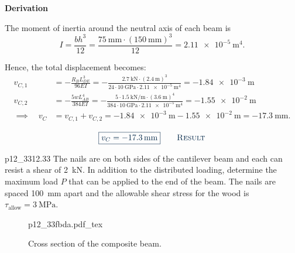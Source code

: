 \documentclass[a4paper]{article}
\newcommand{\incfig}[2][1]{%
  \def\svgwidth{#1\columnwidth}
  {#2.pdf_tex}
}
\newcounter{problem}
\numberwithin{equation}{problem}
\newcommand{\AUheading}[1]{%
  \par\vspace{.4\baselineskip}%
  {\sffamily\bfseries\color{AUblueDark}#1\par}%
  \nobreak%
}
\newenvironment{derivation}[1][Derivation]{%
  \AUheading{#1}
  \begingroup\allowdisplaybreaks
  \setlength{\abovedisplayskip}{6pt}%
  \setlength{\belowdisplayskip}{6pt}%
  \setlength{\abovedisplayshortskip}{4pt}%
  \setlength{\belowdisplayshortskip}{4pt}%
}{\par\endgroup\medskip}
\newcommand{\finalresult}[1]{%
  \vspace{.2\baselineskip}%
  \begin{equation}
    {\color{AUblueDark}\boxed{\displaystyle #1}}
    \tag*{\textsc{\textcolor{AUblueDark}{Result}}}
  \end{equation}
  \newpage
}
\begin{document}
\begin{derivation}
  The moment of inertia around the neutral axis of each beam is
  \begin{equation*}
    I = \frac{b h^3}{12} = \frac{\qty{75}{\mm} \cdot \left( \qty{150}{\mm}  \right)^3}{12} = \qty{2,11e-5}{\m^{4}} 
  .\end{equation*}
  
  Hence, the total displacement becomes:
  \begin{align*}
    v_{C,1} &= - \frac{R_B L_{DE}^3}{96 EI} = - \frac{\qty{2,7}{\kN} \cdot \left( \qty{2,4}{\m}  \right)^3}{24 \cdot \qty{10}{\GPa} \cdot \qty{2,11e-5}{\m^{4}} } = \qty{-1,84e-3}{\m} \\
    v_{C,2} &= - \frac{5 w L_{AB}^{4}}{384 EI} = - \frac{5 \cdot \qty{1,5}{\kN\per\m} \cdot \left( \qty{3,6}{\m}  \right)^{4}}{384 \cdot \qty{10}{\GPa} \cdot \qty{2,11e-5}{\m^{4}} } = \qty{-1,55e-2}{\m}  \\
    \implies \quad v_C &= v_{C,1} + v_{C,2} = \qty{-1,84e-3}{\m} - \qty{1,55e-2}{\m} = \qty{-17,3}{\mm}
  .\end{align*}
\end{derivation}

\finalresult{
  v_C = \qty{-17,3}{\mm}
}

\begin{problemwithimage}{p12_33}{12.33}
  The nails are on both sides of the cantilever beam and each can resist a shear of \qty{2}{\kN}.
  In addition to the distributed loading, determine the maximum load $P$ that can be applied to the end of the beam.
  The nails are spaced \qty{100}{\mm} apart and the allowable shear stress for the wood is $\tau_{\text{allow}} = \qty{3}{\MPa}$.
\end{problemwithimage}

\begin{figure}[ht]
    \centering
    \incfig[0.75]{p12_33fbda}
    \caption{Cross section of the composite beam.}
    \label{fig:p12_33fbda}
\end{figure}
\end{document}
